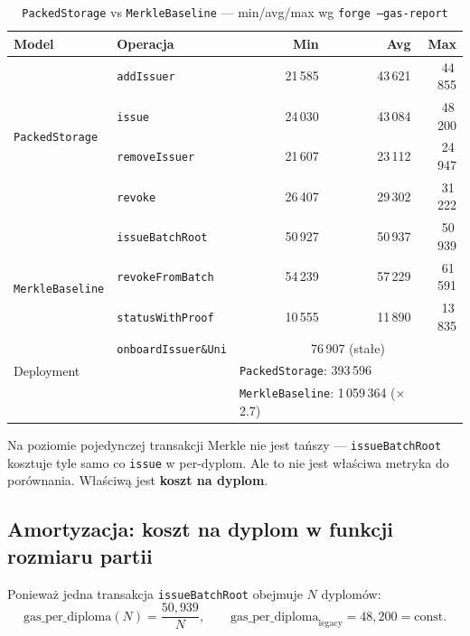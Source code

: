 \documentclass[11pt,a4paper]{article}
\begin{document}
\begin{table}[H]
\centering
\caption{\texttt{PackedStorage} vs \texttt{MerkleBaseline} --- min/avg/max wg \texttt{forge --gas-report}}
\begin{tabular}{llrrr}
\toprule
Model & Operacja & Min & Avg & Max \\
\midrule
\multirow{4}{*}{\texttt{PackedStorage}} &
  \texttt{addIssuer}    & 21\,585 & 43\,621 & 44\,855 \\
& \texttt{issue}        & 24\,030 & 43\,084 & 48\,200 \\
& \texttt{removeIssuer} & 21\,607 & 23\,112 & 24\,947 \\
& \texttt{revoke}       & 26\,407 & 29\,302 & 31\,222 \\
\midrule
\multirow{4}{*}{\texttt{MerkleBaseline}} &
  \texttt{issueBatchRoot}  & 50\,927 & 50\,937 & 50\,939 \\
& \texttt{revokeFromBatch} & 54\,239 & 57\,229 & 61\,591 \\
& \texttt{statusWithProof} & 10\,555 & 11\,890 & 13\,835 \\
& \texttt{onboardIssuer\&Uni} & \multicolumn{3}{c}{76\,907 (stałe)} \\
\midrule
\multicolumn{2}{l}{Deployment} & \multicolumn{2}{l}{\texttt{PackedStorage}: 393\,596} & \\
\multicolumn{2}{l}{} & \multicolumn{2}{l}{\texttt{MerkleBaseline}: 1\,059\,364 ($\times$2.7)} & \\
\bottomrule
\end{tabular}
\end{table}

\noindent Na poziomie pojedynczej transakcji Merkle nie jest tańszy ---
\texttt{issueBatchRoot} kosztuje tyle samo co \texttt{issue} w per-dyplom.
Ale to nie jest właściwa metryka do porównania. Właściwą jest
\textbf{koszt na dyplom}.

\subsection{Amortyzacja: koszt na dyplom w funkcji rozmiaru partii}

Ponieważ jedna transakcja \texttt{issueBatchRoot} obejmuje \(N\) dyplomów:
\[
  \text{gas\_per\_diploma}(N) = \frac{50{,}939}{N},
  \qquad
  \text{gas\_per\_diploma}_\text{legacy} = 48{,}200 = \text{const}.
\]
\end{document}
